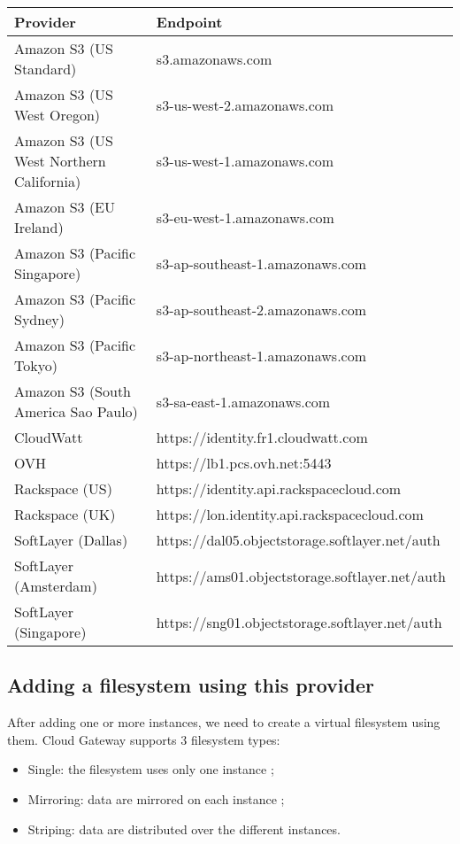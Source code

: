 \documentclass[11pt,fleqn,openany]{book} %
\begin{document}
\begin{tabular}{|l|l|}
\hline
\textbf{Provider} & \textbf{Endpoint}  \\
\hline
Amazon S3 (US Standard) & s3.amazonaws.com \\
Amazon S3 (US West Oregon) & s3-us-west-2.amazonaws.com \\
Amazon S3 (US West Northern California) & s3-us-west-1.amazonaws.com \\
Amazon S3 (EU Ireland) & s3-eu-west-1.amazonaws.com \\
Amazon S3 (Pacific Singapore) & s3-ap-southeast-1.amazonaws.com \\
Amazon S3 (Pacific Sydney) & s3-ap-southeast-2.amazonaws.com \\
Amazon S3 (Pacific Tokyo) & s3-ap-northeast-1.amazonaws.com \\
Amazon S3 (South America Sao Paulo) & s3-sa-east-1.amazonaws.com \\
CloudWatt & https://identity.fr1.cloudwatt.com \\
OVH & https://lb1.pcs.ovh.net:5443 \\
Rackspace (US) & https://identity.api.rackspacecloud.com \\
Rackspace (UK) & https://lon.identity.api.rackspacecloud.com \\
SoftLayer (Dallas) & https://dal05.objectstorage.softlayer.net/auth \\
SoftLayer (Amsterdam) & https://ams01.objectstorage.softlayer.net/auth \\
SoftLayer (Singapore) & https://sng01.objectstorage.softlayer.net/auth \\
\hline
\end{tabular}


\subsection*{Adding a filesystem using this provider}

After adding one or more instances, we need to create a virtual filesystem using them. Cloud Gateway supports 3 filesystem types:\\

\begin{itemize}
\item Single: the filesystem uses only one instance ;
\item Mirroring: data are mirrored on each instance ;
\item Striping: data are distributed over the different instances.\\
\end{itemize}
\end{document}
